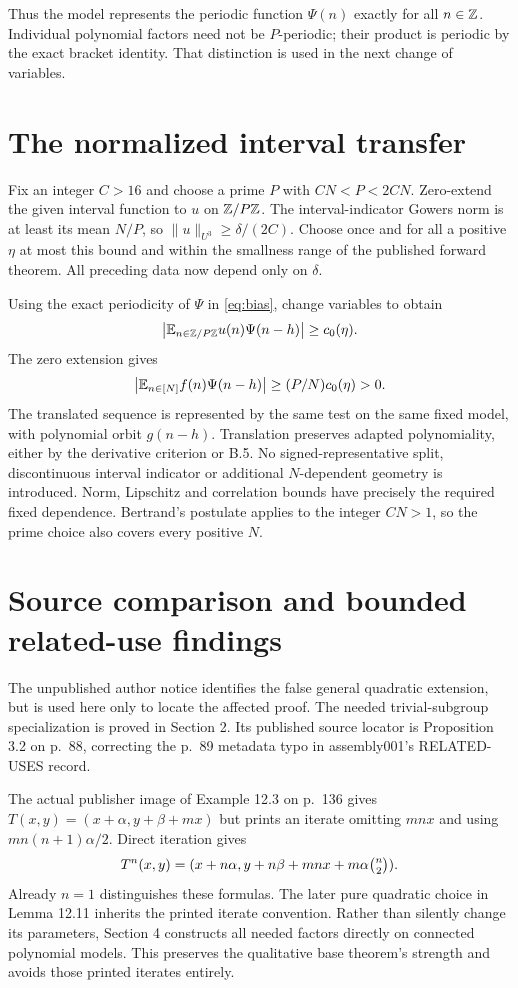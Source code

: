 \documentclass[11pt]{article}
\begin{document}
Thus the model represents the periodic function $\Psi(n)$ exactly
for all $n\in\mathbb Z$. Individual polynomial factors need not be
$P$-periodic; their product is periodic by the exact bracket identity.
That distinction is used in the next change of variables.

\section{The normalized interval transfer}

Fix an integer $C>16$ and choose a prime $P$ with $CN<P<2CN$.
Zero-extend the given interval function to $u$ on $\mathbb Z/P\mathbb Z$.
The interval-indicator Gowers norm is at least its mean $N/P$, so
$\|u\|_{U^3}\geq\delta/(2C)$. Choose once and for all a positive
$\eta$ at most this bound and within the smallness range of the
published forward theorem. All preceding data now depend only on
$\delta$.

Using the exact periodicity of $\Psi$ in \eqref{eq:bias}, change
variables to obtain
\[
 \left|\mathbb E_{n\in\mathbb Z/P\mathbb Z}u(n)\Psi(n-h)\right|\geq c_0(\eta).
\]
The zero extension gives
\[
 \left|\mathbb E_{n\in[N]}f(n)\Psi(n-h)\right|
 \geq (P/N)c_0(\eta)>0.
\]
The translated sequence is represented by the same test on the same
fixed model, with polynomial orbit $g(n-h)$. Translation preserves
adapted polynomiality, either by the derivative criterion or B.5.
No signed-representative split, discontinuous interval indicator or
additional $N$-dependent geometry is introduced. Norm, Lipschitz
and correlation bounds have precisely the required fixed dependence.
Bertrand's postulate applies to the integer $CN>1$, so the prime
choice also covers every positive $N$.

\section{Source comparison and bounded related-use findings}

The unpublished author notice identifies the false general quadratic
extension, but is used here only to locate the affected proof. The
needed trivial-subgroup specialization is proved in Section 2.
Its published source locator is Proposition 3.2 on p.~88, correcting
the p.~89 metadata typo in assembly001's RELATED-USES record.

The actual publisher image of Example 12.3 on p.~136 gives
$T(x,y)=(x+\alpha,y+\beta+mx)$ but prints an iterate omitting
$mnx$ and using $mn(n+1)\alpha/2$. Direct iteration gives
\[
 T^n(x,y)=(x+n\alpha,
 y+n\beta+mnx+m\alpha\tbinom n2).
\]
Already $n=1$ distinguishes these formulas. The later pure quadratic
choice in Lemma 12.11 inherits the printed iterate convention.
Rather than silently change its parameters, Section 4 constructs
all needed factors directly on connected polynomial models.
This preserves the qualitative base theorem's strength and avoids
those printed iterates entirely.
\end{document}
